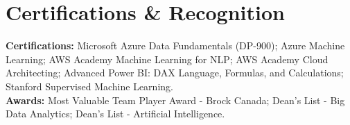 \documentclass[10.5pt,letterpaper]{article}
\begin{document}
\section{Certifications \& Recognition}
\noindent\textbf{Certifications:} Microsoft Azure Data Fundamentals (DP-900); Azure Machine Learning; AWS Academy Machine Learning for NLP; AWS Academy Cloud Architecting; Advanced Power BI: DAX Language, Formulas, and Calculations; Stanford Supervised Machine Learning.\\\noindent\textbf{Awards:} Most Valuable Team Player Award - Brock Canada; Dean's List - Big Data Analytics; Dean's List - Artificial Intelligence.
\end{document}
